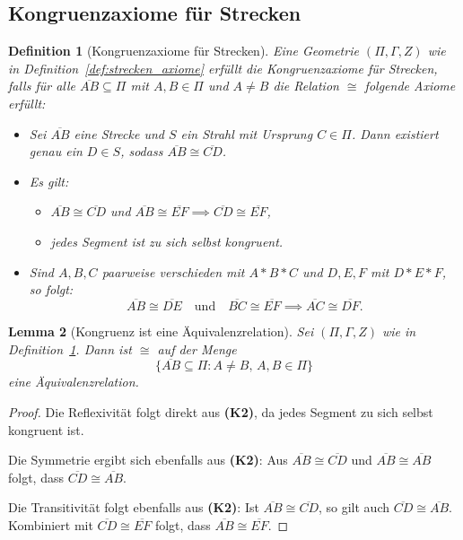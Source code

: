 \documentclass[a4paper,12pt]{article}
\theoremstyle{break}
\newtheorem{definition}{Definition}[section]
\newtheorem{lemma}[definition]{Lemma}
\begin{document}
\subsection{Kongruenzaxiome für Strecken}

\begin{definition}[Kongruenzaxiome für Strecken]\label{def:kongruenzaxiome_strecken}
Eine Geometrie \((\Pi, \Gamma, Z)\) wie in Definition~\ref{def:strecken_axiome} erfüllt die \emph{Kongruenzaxiome für Strecken}, falls für alle \(\overline{AB} \subseteq \Pi\) mit \(A, B \in \Pi\) und \(A \neq B\) die Relation \(\cong\) folgende Axiome erfüllt:
\begin{itemize}
    \item[\textbf{(K1)}] Sei \(\overline{AB}\) eine Strecke und \(S\) ein Strahl mit Ursprung \(C \in \Pi\). Dann existiert genau ein \(D \in S\), sodass \(\overline{AB} \cong \overline{CD}\).
    \item[\textbf{(K2)}] Es gilt:
    \begin{itemize}
        \item \(\overline{AB} \cong \overline{CD}\) und \(\overline{AB} \cong \overline{EF} \implies \overline{CD} \cong \overline{EF}\),
        \item jedes Segment ist zu sich selbst kongruent.
    \end{itemize}
    \item[\textbf{(K3)}] Sind \(A, B, C\) paarweise verschieden mit \(A * B * C\) und \(D, E, F\) mit \(D * E * F\), so folgt:
    \[
    \overline{AB} \cong \overline{DE} \quad \text{und} \quad \overline{BC} \cong \overline{EF} \implies \overline{AC} \cong \overline{DF}.
    \]
\end{itemize}
\end{definition}

\begin{lemma}[Kongruenz ist eine Äquivalenzrelation]\label{lemma:kong_ist_äqu}
Sei \((\Pi, \Gamma, Z)\) wie in Definition~\ref{def:kongruenzaxiome_strecken}. Dann ist \(\cong\) auf der Menge 
\[
\{\overline{AB} \subseteq \Pi : A \neq B, \, A, B \in \Pi\}
\]
eine Äquivalenzrelation.
\end{lemma}

\begin{proof}
Die Reflexivität folgt direkt aus \textbf{(K2)}, da jedes Segment zu sich selbst kongruent ist.

Die Symmetrie ergibt sich ebenfalls aus \textbf{(K2)}: Aus \(\overline{AB} \cong \overline{CD}\) und \(\overline{AB} \cong \overline{AB}\) folgt, dass \(\overline{CD} \cong \overline{AB}\).

Die Transitivität folgt ebenfalls aus \textbf{(K2)}: Ist \(\overline{AB} \cong \overline{CD}\), so gilt auch \(\overline{CD} \cong \overline{AB}\). Kombiniert mit \(\overline{CD} \cong \overline{EF}\) folgt, dass \(\overline{AB} \cong \overline{EF}\).
\end{proof}
\end{document}
